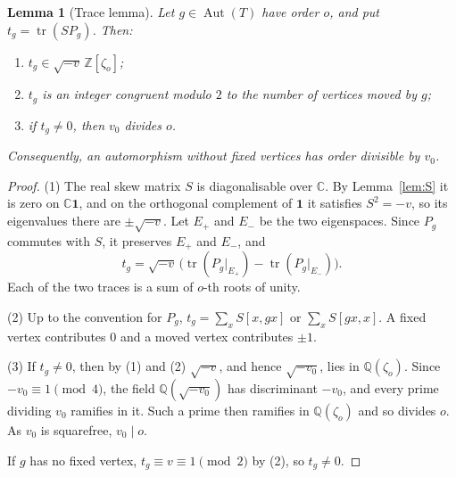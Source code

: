 \documentclass[11pt]{amsart}
\newtheorem{lemma}[theorem]{Lemma}
\theoremstyle{definition}
\theoremstyle{remark}
\newcommand{\Q}{\mathbb{Q}}
\newcommand{\Z}{\mathbb{Z}}
\newcommand{\C}{\mathbb{C}}
\newcommand{\one}{\mathbf{1}}
\newcommand{\Aut}{\operatorname{Aut}}
\newcommand{\tr}{\operatorname{tr}}
\begin{document}
\begin{lemma}[Trace lemma]\label{lem:trace}
Let $g\in\Aut(T)$ have order $o$, and put $t_g=\tr(SP_g)$. Then:
\begin{enumerate}
\item $t_g\in\sqrt{-v}\,\Z[\zeta_o]$;
\item $t_g$ is an integer congruent modulo $2$ to the number of vertices moved by $g$;
\item if $t_g\ne0$, then $v_0$ divides $o$.
\end{enumerate}
Consequently, an automorphism without fixed vertices has order divisible by $v_0$.
\end{lemma}
\begin{proof}
(1) The real skew matrix $S$ is diagonalisable over $\C$. By Lemma~\ref{lem:S} it is zero on $\C\one$, and on the orthogonal complement of $\one$ it satisfies $S^2=-v$, so its eigenvalues there are $\pm\sqrt{-v}$. Let $E_+$ and $E_-$ be the two eigenspaces. Since $P_g$ commutes with $S$, it preserves $E_+$ and $E_-$, and
\[
t_g=\sqrt{-v}\,\bigl(\tr(P_g|_{E_+})-\tr(P_g|_{E_-})\bigr).
\]
Each of the two traces is a sum of $o$-th roots of unity.

(2) Up to the convention for $P_g$, $t_g=\sum_xS[x,gx]$ or $\sum_xS[gx,x]$. A fixed vertex contributes $0$ and a moved vertex contributes $\pm1$.

(3) If $t_g\ne0$, then by (1) and (2) $\sqrt{-v}$, and hence $\sqrt{-v_0}$, lies in $\Q(\zeta_o)$. Since $-v_0\equiv1\pmod4$, the field $\Q(\sqrt{-v_0})$ has discriminant $-v_0$, and every prime dividing $v_0$ ramifies in it. Such a prime then ramifies in $\Q(\zeta_o)$ and so divides $o$. As $v_0$ is squarefree, $v_0\mid o$.

If $g$ has no fixed vertex, $t_g\equiv v\equiv1\pmod2$ by (2), so $t_g\ne0$.
\end{proof}
\end{document}
